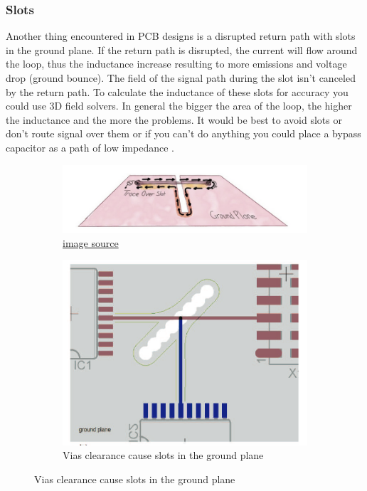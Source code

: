 \documentclass[final]{cubedoc}
\begin{document}
	
	
	\subsubsection{Slots}
	
	Another thing encountered in PCB designs is a disrupted return path with slots in the ground plane. If the return path is disrupted, the current will flow around the loop, thus the inductance increase resulting to more emissions and voltage drop (ground bounce). The field of the signal path during the slot isn't canceled by the return path. To calculate the inductance of these slots for accuracy you could use 3D field solvers. In general the bigger the area of the loop, the higher the inductance and the more the problems. It would be best to avoid slots or don't route signal over them or if you can't do anything you could place a bypass capacitor as a path of low impedance \cite{stackexchange:radiation, brooks2003signal}.
	
	
	
	\begin{figure}[h!]
		\centering
		\begin{subfigure}{.5\textwidth}
			\centering
			\includegraphics[keepaspectratio, width=\textwidth]{assets/slot.png}
			\caption{\href{https://web.archive.org/web/20200814093921/https://www.tempoautomation.com/blog/design-to-avoid-emi-problems-keep-clocks-away-from-unintended-antennas/}{image source}}
		\end{subfigure}%
		\begin{subfigure}{.5\textwidth}
			\centering	
			\includegraphics[width=\textwidth]{assets/slot_via.png}
			\caption{Vias clearance cause slots in the ground plane \cite{instruments2006high}}
		\end{subfigure}
	\end{figure}
	
\end{document}
